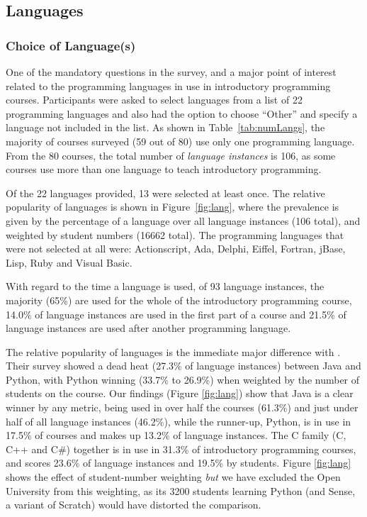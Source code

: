 \documentclass{sig-alternate}
\begin{document}
\subsection{Languages}

\subsubsection{Choice of Language(s)}

One of the mandatory questions in the survey, and a major point of interest related to the programming languages in use in introductory programming courses. Participants were asked to select languages from a list of 22 programming languages and also had the option to choose ``Other'' and specify a language not included in the list. As shown in Table~\ref{tab:numLangs}, the majority of courses surveyed (59 out of 80) use only one programming language. From the 80 courses, the total number of {\emph{language instances}} is 106, as some courses use more than one language to teach introductory programming. 


Of the 22 languages provided, 13 were selected at least once. The relative popularity of languages is shown in Figure~\ref{fig:lang}, where the prevalence is given by the percentage of a language over all language instances (106 total), and weighted by student numbers (16662 total). The programming languages that were not selected at all were: Actionscript, Ada, Delphi, Eiffel, Fortran, jBase, Lisp, Ruby and Visual Basic.

With regard to the time a language is used, of 93 language instances, the majority (65\%) are used for the whole of the introductory programming course, 14.0\% of language instances are used in the first part of a course and 21.5\% of language instances are used after another programming language.

The relative popularity of languages is the immediate major difference with
\cite{mason+cooper:2014}. Their survey showed a dead heat (27.3\% of
language instances) between Java and Python, with Python winning (33.7\% to
26.9\%) when weighted by the number of students on the course.  Our
findings (Figure \ref{fig:lang}) show that Java is a clear winner by
any metric, being used in over half the courses (61.3\%) and just under half of all language instances (46.2\%), while the
runner-up, Python, is in use in 17.5\% of courses and makes up 13.2\% of language instances. The C family (C, C++ and C\#) together
is in use in 31.3\% of introductory programming courses, and scores 23.6\% of language instances and 19.5\% by students. Figure
\ref{fig:lang} shows the effect of student-number weighting \emph{but}
we have excluded the Open University from this weighting, as its 3200
students learning Python (and Sense, a variant of Scratch) would have
distorted the comparison.
\end{document}
